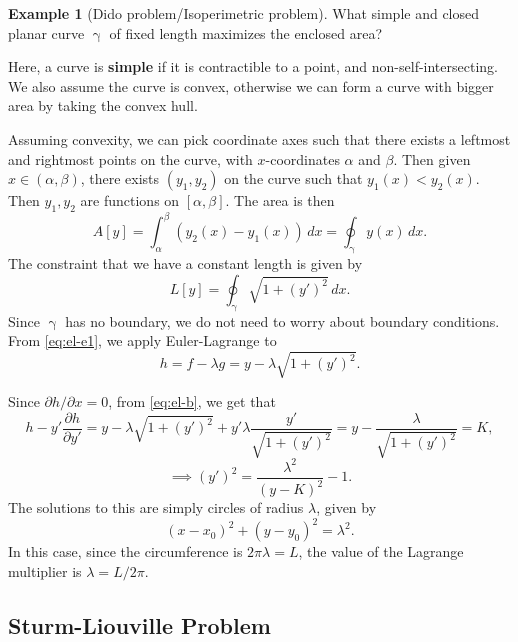 \documentclass[12pt]{article}
\theoremstyle{definition}
\newtheorem{example}{Example}[section]
\theoremstyle{remark}
\begin{document}
\begin{adjustbox}{minipage = \columnwidth - 25.5pt, margin=1em, frame=1pt, margin=0em}
	\begin{example}[Dido problem/Isoperimetric problem]
	What simple and closed planar curve $\upgamma$ of fixed length maximizes the enclosed area?
\end{example}

Here, a curve is \textbf{simple} if it is contractible to a point, and non-self-intersecting. We also assume the curve is convex, otherwise we can form a curve with bigger area by taking the convex hull.

Assuming convexity, we can pick coordinate axes such that there exists a leftmost and rightmost points on the curve, with $x$-coordinates $\alpha$ and $\beta$. Then given $x \in (\alpha, \beta)$, there exists $(y_1, y_2)$ on the curve such that $y_1(x) < y_2(x)$. Then $y_1, y_2$ are functions on $[\alpha, \beta]$. The area is then
\[
	A[y] = \int_{\alpha}^{\beta} (y_2(x) - y_1(x)) \, dx = \oint_{\upgamma} y(x) \, dx
.\]
The constraint that we have a constant length is given by
\[
	L[y] = \oint_{\upgamma} \sqrt{1 + (y')^2}\, dx
.\]
Since $\upgamma$ has no boundary, we do not need to worry about boundary conditions. From \eqref{eq:el-e1}, we apply Euler-Lagrange to
\[
	h = f - \lambda g = y - \lambda \sqrt{1 + (y')^2}
.\]
\end{adjustbox}

\begin{adjustbox}{minipage = \columnwidth - 25.5pt, margin=1em, frame=1pt, margin=0em}
Since $\partial h /\partial x = 0$, from \eqref{eq:el-b}, we get that
\[
	h - y' \frac{\partial h}{\partial y'} = y - \lambda\sqrt{1 + (y')^2} + y' \lambda \frac{y'}{\sqrt{1 + (y')^2}} = y - \frac{\lambda}{\sqrt{1 + (y')^2}} = K
,\]
\[
	\implies (y')^2 = \frac{\lambda^2}{(y - K)^2} - 1
.\]
The solutions to this are simply circles of radius $\lambda$, given by
\[
	(x - x_0)^2 + (y - y_0)^2 = \lambda^2
.\]
In this case, since the circumference is $2\pi\lambda = L$, the value of the Lagrange multiplier is $\lambda = L/2\pi$.

\end{adjustbox}

\subsection{Sturm-Liouville Problem}%
\label{sub:sturm_liouville_problem}
\end{document}
